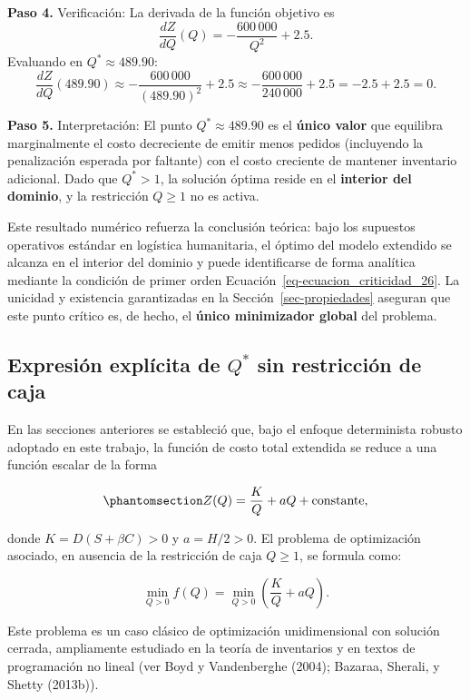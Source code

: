 \documentclass[
  spanish,
  us-letterpaper,
]{scrreprt}
\numberwithin{equation}{section}
\begin{document}
\textbf{Paso 4.} Verificación: La derivada de la función objetivo es \[
\frac{dZ}{dQ}(Q) = -\frac{600\,000}{Q^2} + 2.5.
\] Evaluando en \(Q^* \approx 489.90\): \[
\frac{dZ}{dQ}(489.90) \approx -\frac{600\,000}{(489.90)^2} + 2.5 \approx -\frac{600\,000}{240\,000} + 2.5 = -2.5 + 2.5 = 0.
\]

\textbf{Paso 5.} Interpretación: El punto \(Q^* \approx 489.90\) es el
\textbf{único valor} que equilibra marginalmente el costo decreciente de
emitir menos pedidos (incluyendo la penalización esperada por faltante)
con el costo creciente de mantener inventario adicional. Dado que
\(Q^* > 1\), la solución óptima reside en el \textbf{interior del
dominio}, y la restricción \(Q \geq 1\) no es activa.

Este resultado numérico refuerza la conclusión teórica: bajo los
supuestos operativos estándar en logística humanitaria, el óptimo del
modelo extendido se alcanza en el interior del dominio y puede
identificarse de forma analítica mediante la condición de primer orden
Ecuación~\ref{eq-ecuacion_criticidad_26}. La unicidad y existencia
garantizadas en la Sección~\ref{sec-propiedades} aseguran que este punto
crítico es, de hecho, el \textbf{único minimizador global} del problema.

\subsection{\texorpdfstring{Expresión explícita de \(Q^*\) sin
restricción de
caja}{Expresión explícita de Q\^{}* sin restricción de caja}}\label{expresiuxf3n-expluxedcita-de-q-sin-restricciuxf3n-de-caja}

En las secciones anteriores se estableció que, bajo el enfoque
determinista robusto adoptado en este trabajo, la función de costo total
extendida se reduce a una función escalar de la forma

\begin{equation}\phantomsection\label{eq-ZQ_sin_caja}{
Z(Q) = \frac{K}{Q} + a Q + \text{constante},
}\end{equation}

donde \(K = D(S + \beta C) > 0\) y \(a = H/2 > 0\). El problema de
optimización asociado, en ausencia de la restricción de caja
\(Q \geq 1\), se formula como:

\[
\min_{Q > 0} f(Q) = \min_{Q > 0} \left( \frac{K}{Q} + a Q \right).
\]

Este problema es un caso clásico de optimización unidimensional con
solución cerrada, ampliamente estudiado en la teoría de inventarios y en
textos de programación no lineal (ver Boyd y Vandenberghe (2004);
Bazaraa, Sherali, y Shetty (2013b)).
\end{document}

